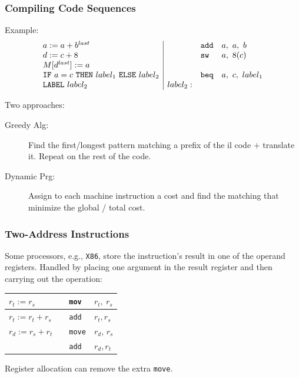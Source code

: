 \documentclass{beamer}
\begin{document}
\begin{frame}
\frametitle{Compiling Code Sequences}

Example:
\renewcommand{\arraystretch}{0.9}
\[\begin{array}{l|lll}
a := a+b^{last} & & {\tt add} & a,~a,~b \\
d := c+8 & & {\tt sw} & a,~8(c) \\
M[d^{last}] := a & && \\
{\tt IF}~a = c~{\tt THEN}~label_1~ {\tt ELSE}~ label_2 &
 & {\tt beq} & a,~c,~label_1 \\
{\tt LABEL}~label_2~& label_2:&&
\end{array}\]

\bigskip
Two approaches:
\smallskip

\begin{description}

\item[Greedy Alg:] Find the first/longest pattern matching a prefix of the
                    {\sc il} code $+$ translate it. Repeat on the rest of the code.\smallskip


\item[Dynamic Prg:] Assign to each machine instruction a cost and find the
                        matching that minimize the global / total cost.

\end{description}

\end{frame}




\begin{frame}
\frametitle{Two-Address Instructions}

Some processors, e.g., {\tt X86}, store the instruction's result in one of the
operand registers. Handled by placing one argument in the result register and 
then carrying out the operation:

\bigskip

\renewcommand{\arraystretch}{0.9}
\begin{center}
\begin{tabular}{|l|lll|}\hline

$ r_t := r_s $
&&  {\tt mov} & $r_t,~r_s$ \\\hline

$ r_t := r_t+r_s$
&& {\tt add} & $r_t,r_s$ \\\hline

$  r_d := r_s + r_t  $
&&  {\tt move} & $r_d$, $r_s$ \\
&&  {\tt add} & $r_d,r_t$ \\\hline
\end{tabular}
\end{center}

\bigskip

Register allocation can remove the extra {\tt move}.


\end{frame}
\end{document}
